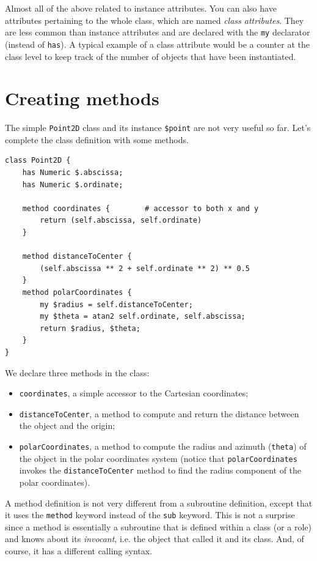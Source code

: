 Almost all of the above related to instance attributes. You 
can also have attributes pertaining to the whole class, which 
are named \emph{class attributes}. They are less common than 
instance attributes and are declared with the 
{\tt my} declarator (instead of {\tt has}). A typical example 
of a class attribute would be a counter at the class level 
to keep track of the number of objects that have been 
instantiated. 


\section{Creating methods}

The simple {\tt Point2D} class and its instance \verb'$point' 
are not very useful so far. Let's complete the class definition 
with some methods.

\begin{verbatim}
class Point2D {
    has Numeric $.abscissa;
    has Numeric $.ordinate;
    
    method coordinates {        # accessor to both x and y
        return (self.abscissa, self.ordinate)
    }
    
    method distanceToCenter {
        (self.abscissa ** 2 + self.ordinate ** 2) ** 0.5
    }
    method polarCoordinates {
        my $radius = self.distanceToCenter;
        my $theta = atan2 self.ordinate, self.abscissa;
        return $radius, $theta;
    }
}
\end{verbatim}

We declare three methods in the class:
\begin{itemize}
\item {\tt coordinates}, a simple accessor to the Cartesian 
coordinates;

\item{\tt distanceToCenter}, a method to compute and return 
the distance between the object and the origin;

\item{\tt polarCoordinates}, a method to compute the radius 
and azimuth ({\tt theta}) of the object in the polar 
coordinates system (notice that {\tt polarCoordinates} 
invokes the {\tt distanceToCenter} method to find the radius 
component of the polar coordinates).
\end{itemize}

A method definition is not very different from a subroutine 
definition, except that it uses the {\tt method} keyword 
instead of the {\tt sub} keyword. This is not a surprise 
since a method is essentially a subroutine that is defined 
within a class (or a role) and knows about its 
\emph{invocant}, i.e. the object that called it and its class. 
And, of course, it has a different calling syntax.

